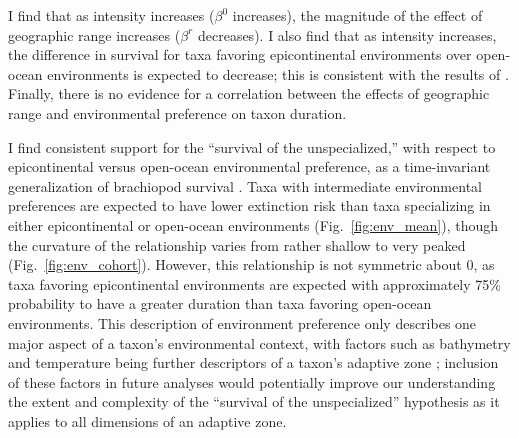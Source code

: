 \documentclass[11pt]{article}
\begin{document}
I find that as intensity increases (\(\beta^{0}\) increases), the magnitude of the effect of geographic range increases (\(\beta^{r}\) decreases). I also find that as intensity increases, the difference in survival for taxa favoring epicontinental environments over open-ocean environments is expected to decrease; this is consistent with the results of \citet{Miller2009a}. Finally, there is no evidence for a correlation between the effects of geographic range and environmental preference on taxon duration. %


I find consistent support for the ``survival of the unspecialized,'' with respect to epicontinental versus open-ocean environmental preference, as a time-invariant generalization of brachiopod survival \citep{Simpson1944}. Taxa with intermediate environmental preferences are expected to have lower extinction risk than taxa specializing in either epicontinental or open-ocean environments (Fig.~\ref{fig:env_mean}), though the curvature of the relationship varies from rather shallow to very peaked (Fig.~\ref{fig:env_cohort}). However, this relationship is not symmetric about 0, as taxa favoring epicontinental environments are expected with approximately 75\% probability to have a greater duration than taxa favoring open-ocean environments. This description of environment preference only describes one major aspect of a taxon's environmental context, with factors such as bathymetry and temperature being further descriptors of a taxon's adaptive zone \citep{Nurnberg2013a,Harnik2013,Harnik2011,Heim2011}; inclusion of these factors in future analyses would potentially improve our understanding the extent and complexity of the ``survival of the unspecialized'' hypothesis as it applies to all dimensions of an adaptive zone.
\end{document}

